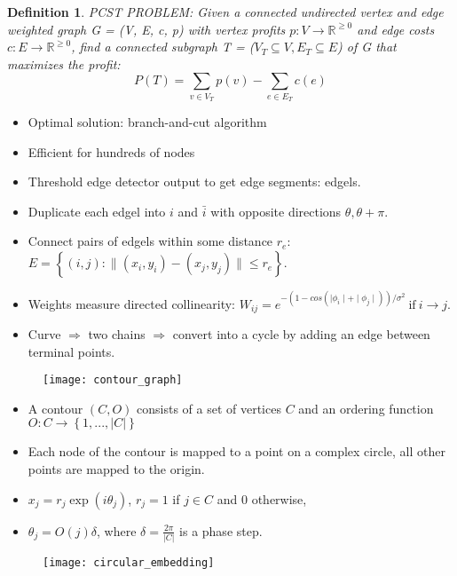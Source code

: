\documentclass[11pt, a4paper, landscape]{article}
\newtheorem{definition}{Definition}
\begin{document}
\NewPage{}
\vfill
\begin{definition}
PCST PROBLEM: Given a connected undirected vertex and edge weighted graph G = (V, E, c, p) with vertex profits $p: V \rightarrow \mathbb{R}^{\geq 0}$ and edge costs $c: E \rightarrow \mathbb{R}^{\geq 0}$, find a connected subgraph T = ($V_T \subseteq V, E_T \subseteq E$) of G that maximizes the profit:
\begin{equation}
P(T) = \sum\limits_{v \in V_T} p(v) - \sum\limits_{e \in E_T} c(e)
\end{equation}
\end{definition}
\begin{itemize}
\item Optimal solution: branch-and-cut algorithm
\item Efficient for hundreds of nodes
\end{itemize}
\vfill


\NewPage{}
\vfill
\begin{itemize}
\item Threshold edge detector output to get edge segments: edgels.
\item Duplicate each edgel into $i$ and $\bar{i}$ with opposite directions $\theta, \theta + \pi$.
\item Connect pairs of edgels within some distance $r_e$: $E = \left\lbrace (i, j) : \| (x_i, y_i) - (x_j, y_j) \| \leq r_e \right\rbrace $.
\item Weights measure directed collinearity: $W_{ij} = e^{-(1 - cos(\mid \phi_i \mid + \mid \phi_j \mid))/\sigma^2}\ \mathrm{if}\ i \rightarrow j$.
\item Curve $\Rightarrow$ two chains $\Rightarrow$ convert into a cycle by adding an edge between terminal points.
\end{itemize}
\begin{figure}
	\centering
	\texttt{[image: contour\_graph]}
\end{figure}
\vfill


\NewPage{}
\vfill
\begin{itemize}
\item A contour $(C, O)$ consists of a set of vertices $C$ and an ordering function $O: C \rightarrow \left\lbrace 1, ..., \lvert C \rvert \right\rbrace $
\item Each node of the contour is mapped to a point on a complex circle, all other points are mapped to the origin.
\item $x_j = r_j\exp(i\theta_j)$, $r_j = 1$ if $j \in C$ and 0 otherwise,
\item $\theta_j = O(j)\delta$, where $\delta = \frac{2\pi}{\lvert C \rvert}$ is a phase step.
\end{itemize}
\begin{figure}
	\centering
	\texttt{[image: circular\_embedding]}
\end{figure}
\vfill
\end{document}
